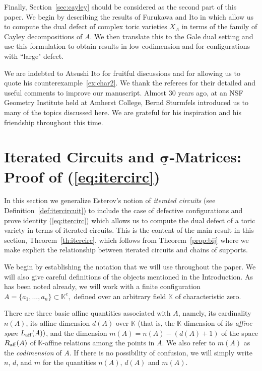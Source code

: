 \documentclass[11pt]{amsart}
\theoremstyle{plain}
\theoremstyle{definition}
\theoremstyle{remark}
\renewcommand{\k}{{\mathbb K}}
\newcommand{\csig}{\ensuremath{\underline{\mathbf \sigma}}}
\numberwithin{equation}{section}
\begin{document}
Finally,  Section~\ref{sec:cayley} should be considered as the second part of this paper.  We begin by describing the results of Furukawa and Ito in \cite{FI}
 which allow us to compute the dual defect of complex toric varieties $X_A$ in terms of the family of Cayley decompositions of $A$.  We then translate this to 
 the Gale dual setting and use this formulation to obtain results in low codimension and for configurations with ``large" defect.


 \medskip

 We are indebted to Atsushi Ito for fruitful discussions and for allowing us to quote
his counterexample~\ref{ex:char2}.  We thank the referees for their detailed and useful comments to improve
our manuscript.   Almost 30 years ago, at an NSF Geometry Institute held at Amherst College, Bernd Sturmfels introduced 
us to many of the topics discussed here. We are grateful for his inspiration and his friendship throughout this time.

\bigskip


\section{Iterated Circuits and $\csig$-Matrices: Proof of (\ref{eq:itercirc})}\label{sec:left=}

In this section we generalize Esterov's notion of {\em iterated circuits} (see Definition~\ref{def:itercircuit}) to include
the case of defective configurations and prove identity (\ref{eq:itercirc}) which allows us to compute the dual defect of a toric variety in terms of iterated circuits. 
This is the content of   the main result in this section, Theorem~\ref{th:itercirc}, which follows from Theorem~\ref{prop:bij} 
where we make explicit the relationship between iterated circuits and  chains of
supports.

We begin by establishing the notation that we will use throughout the paper.  We will also give careful definitions of the objects mentioned in the Introduction.  
As has been noted already, we will work with a finite configuration $A = \{a_1,\dots,a_n\} \subset \k^e,$ defined over an arbitrary field $\k$ of characteristic zero. 

There are three basic affine quantities associated with $A$, namely, its cardinality $n(A)$, its affine dimension $d(A)$ 
over $\k$ (that is, the $\k$-dimension of its {\em affine span} $L_{\rm aff}(A))$, and 
the dimension $m(A)= n(A)-(d(A)+1)$ of the space $R_{\rm aff}(A)$ of $\k$-affine 
relations among the points in $A$. We also refer to $m(A)$ as the {\em codimension} of $A$.   If there is no possibility of confusion, we will simply write $n$, $d$, 
and $m$ for the quantities $n(A)$, $d(A)$ and $m(A)$.
\end{document}

